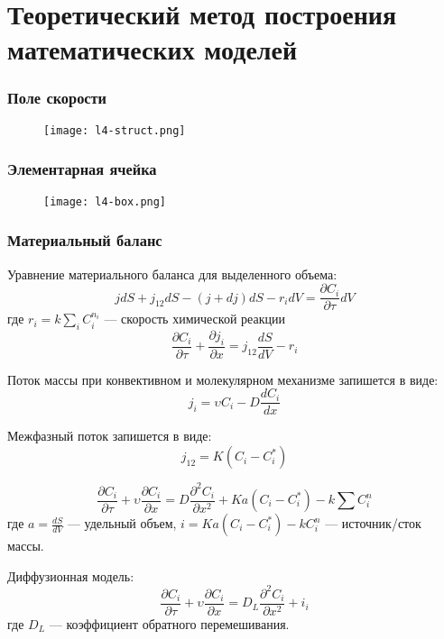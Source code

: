 	\section{Теоретический метод построения математических моделей}
	
\begin{frame}
	\frametitle{Поле скорости}
	
	\begin{figure}[h]
		\texttt{[image: l4-struct.png]}
	\end{figure}
\end{frame}	

\begin{frame}
	\frametitle{Элементарная ячейка}
	
	\begin{figure}[h]
		\texttt{[image: l4-box.png]}
	\end{figure}
\end{frame}	



\begin{frame}
	\frametitle{Материальный баланс}
	Уравнение материального баланса для выделенного объема:
	\begin{equation}
		j dS +j_{12} dS -( j+d j )dS -r_i dV = \dfrac { \partial C_i }  { \partial \tau } dV
	\end{equation}
	где $r_i=k \sum_i C_i^{n_i}$ --- скорость химической реакции
	\begin{equation}
		\dfrac { \partial C_i } { \partial \tau } + \dfrac { \partial j_i } { \partial x } = j_{12} \dfrac { dS } { dV  } - r_i
	\end{equation}
	
	Поток массы при конвективном и молекулярном механизме запишется в виде:
	\begin{equation}
		j_i = \upsilon C_i -D \dfrac{ d C_i } { d x }
	\end{equation}
	
	Межфазный поток запишется в виде:
	\begin{equation}
		j_{12} = K ( C_i - C_i^* )
	\end{equation}
\end{frame}	

\begin{frame}
	\begin{equation}
	\dfrac { \partial C_i } { \partial \tau } + \upsilon \dfrac { \partial C_i }  { \partial x } = D \dfrac { \partial ^2 C_i } {\partial { x^2 }} + K a ( C_i - C_i^* ) - k \sum C_i^n
	\end{equation}
	где $a=\frac{d S}{d V}$ --- удельный объем, $i = K a ( C_i - C_i^* ) -k C_i^n$ --- источник/сток массы.
	
	Диффузионная модель:
	\begin{equation}
	\dfrac { \partial C_i } { \partial \tau } + \upsilon \dfrac { \partial C_i } { \partial x } = D_L \dfrac{ \partial ^2 C_i } {\partial { x^2 }}+ i_i
	\end{equation}
	где $D_L$ --- коэффициент обратного перемешивания.
	
	
\end{frame}	

